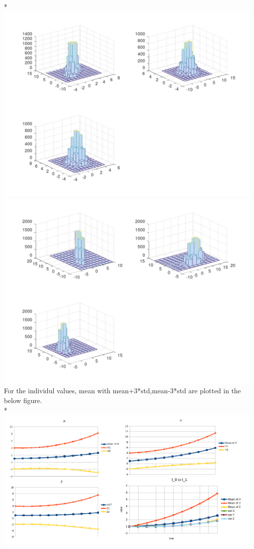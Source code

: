 \documentclass[11pt]{article}
\begin{document}
\\*\includegraphics[scale=0.2]{t_0.5.png}\includegraphics[scale=0.2]{t_1.0.png}
For the individul values, mean with mean+3*std,mean-3*std are plotted in the below figure.
\\*\includegraphics[scale=.5]{x-y-z.png}
\end{document}

